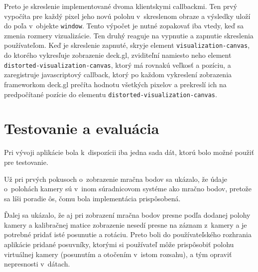 Preto je skreslenie implementované dvoma klientskymi callbackmi. Ten prvý vypočíta pre každý pixel jeho novú polohu v~skreslenom obraze a výsledky uloží do poľa v~objekte \texttt{window}. Tento výpočet je nutné zopakovať iba vtedy, keď sa zmenia rozmery vizualizácie. Ten druhý reaguje na vypnutie a zapnutie skreslenia používateľom. Keď je skreslenie zapnuté, skryje element \texttt{visualization-canvas}, do ktorého vykresľuje zobrazenie deck.gl, zviditeľní namiesto neho element \texttt{distorted-visualization-canvas}, ktorý má rovnakú veľkosť a pozíciu, a zaregistruje javascriptový callback, ktorý po každom vykreslení zobrazenia frameworkom deck.gl prečíta hodnotu všetkých pixelov a prekreslí ich na predpočítané pozície do elementu \texttt{distorted-visualization-canvas}.

\chapter{Testovanie a evaluácia}
\label{ch:vyhodnotenie}

Pri vývoji aplikácie bola k~dispozícii iba jedna sada dát, ktorú bolo možné použiť pre testovanie.

Už pri prvých pokusoch o~zobrazenie mračna bodov sa ukázalo, že údaje o~polohách kamery sú v~inom súradnicovom systéme ako mračno bodov, pretože sa líši poradie ôs, čomu bola implementácia prispôsobená.

Ďalej sa ukázalo, že aj pri zobrazení mračna bodov presne podľa dodanej polohy kamery a kalibračnej matice zobrazenie nesedí presne na záznam z~kamery a je potrebné pridať isté posunutie a rotáciu. Preto boli do používateľského rozhrania aplikácie pridané posuvníky, ktorými si používateľ môže prispôsobiť polohu virtuálnej kamery (posunutím a otočením v~istom rozsahu), a tým opraviť nepresnosti v~dátach.

